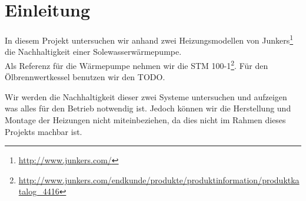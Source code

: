 \chapter{Einleitung}
\label{chap:einleitung}

In diesem Projekt untersuchen wir anhand zwei Heizungsmodellen von Junkers\footnote{\url{http://www.junkers.com/}} die Nachhaltigkeit einer Solewasserwärmepumpe. \\
Als Referenz für die Wärmepumpe nehmen wir die STM 100-1\footnote{\url{http://www.junkers.com/endkunde/produkte/produktinformation/produktkatalog_4416}}. Für den Ölbrennwertkessel benutzen wir den TODO.

Wir werden die Nachhaltigkeit dieser zwei Systeme untersuchen und aufzeigen was alles für den Betrieb notwendig ist. Jedoch können wir die Herstellung und Montage der Heizungen nicht miteinbeziehen, da dies nicht im Rahmen dieses Projekts machbar ist.



